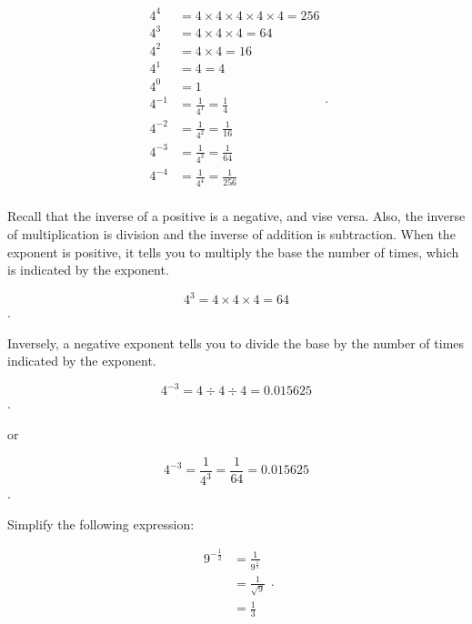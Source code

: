 \begin{equation}
  \label{eqt:negative_rational_exponents}
  \begin{split}
    4^{4} &= 4 \times 4 \times 4 \times 4 \times 4 = 256 \\
    4^{3} &= 4 \times 4 \times 4 = 64 \\
    4^{2} &= 4 \times 4 = 16 \\
    4^{1} &= 4 = 4 \\
    4^{0} &= 1 \\
    4^{-1} &= \frac{1}{4^{1}} = \frac{1}{4} \\
    4^{-2} &= \frac{1}{4^{2}} = \frac{1}{16} \\
    4^{-3} &= \frac{1}{4^{3}} = \frac{1}{64} \\
    4^{-4} &= \frac{1}{4^{4}} = \frac{1}{256} \\
  \end{split}
.\end{equation}

Recall that the inverse of a positive is a negative, and vise versa. Also, the
inverse of multiplication is division and the inverse of addition is
subtraction. When the exponent is positive, it tells you to multiply the base
the number of times, which is indicated by the exponent.

\[ 4^{3} = 4 \times 4 \times 4 = 64 \].

Inversely, a negative exponent tells you to divide the base by the number of
times indicated by the exponent.

\[ 4^{-3} = 4 \div 4 \div 4 = 0.015625 \].

or

\[ 4^{-3} = \frac{1}{4^{3}} = \frac{1}{64} = 0.015625 \].

\begin{example}
  \label{exm:negative_rational_exponents}

  Simplify the following expression:

  \begin{equation}
    \label{eqt:negative_rational_exponents_simplify_2}
    \begin{split}
      9^{-\frac{1}{2}} &= \frac{1}{9^{\frac{1}{1}}} \\
             &= \frac{1}{\sqrt{9}} \\
             &= \frac{1}{3}
    \end{split}
  .\end{equation}
\end{example}


\newpage

